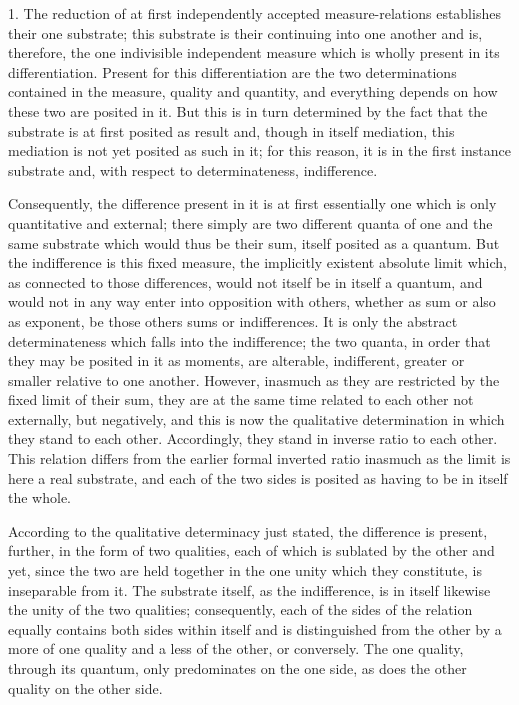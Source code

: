 1. The reduction of at first
independently accepted measure-relations
establishes their one substrate;
this substrate is their continuing into one another
and is, therefore, the one indivisible independent measure
which is wholly present in its differentiation.
Present for this differentiation are
the two determinations contained
in the measure, quality and quantity,
and everything depends on how these two are posited in it.
But this is in turn determined by the fact that
the substrate is at first posited as result
and, though in itself mediation,
this mediation is not yet posited as such in it;
for this reason, it is in the first instance substrate
and, with respect to determinateness, indifference.

Consequently, the difference present in it is
at first essentially one which is only quantitative and external;
there simply are two different quanta of one and the same substrate
which would thus be their sum, itself posited as a quantum.
But the indifference is this fixed measure,
the implicitly existent absolute limit which,
as connected to those differences,
would not itself be in itself a quantum,
and would not in any way enter
into opposition with others,
whether as sum or also as exponent,
be those others sums or indifferences.
It is only the abstract determinateness
which falls into the indifference;
the two quanta, in order that
they may be posited in it as moments,
are alterable, indifferent, greater or smaller
relative to one another.
However, inasmuch as they are restricted
by the fixed limit of their sum,
they are at the same time related to
each other not externally, but negatively,
and this is now the qualitative determination
in which they stand to each other.
Accordingly, they stand in inverse ratio to each other.
This relation differs from the earlier formal inverted ratio
inasmuch as the limit is here a real substrate,
and each of the two sides is posited as
having to be in itself the whole.

According to the qualitative determinacy just stated,
the difference is present, further, in the form of two qualities,
each of which is sublated by the other
and yet, since the two are held together in the one unity
which they constitute, is inseparable from it.
The substrate itself, as the indifference,
is in itself likewise the unity of the two qualities;
consequently, each of the sides of the relation
equally contains both sides within itself
and is distinguished from the other
by a more of one quality
and a less of the other, or conversely.
The one quality, through its quantum,
only predominates on the one side,
as does the other quality on the other side.

